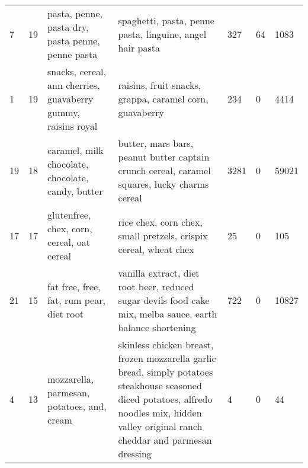 \begin{tabular}{lllllll}
7 & 19 & pasta, penne, pasta dry, pasta penne, penne pasta & spaghetti, pasta, penne pasta, linguine, angel hair pasta & 327 & 64 & 1083 \\
1 & 19 & snacks, cereal, ann cherries, guavaberry gummy, raisins royal & raisins, fruit snacks, grappa, caramel corn, guavaberry & 234 & 0 & 4414 \\
19 & 18 & caramel, milk chocolate, chocolate, candy, butter & butter, mars bars, peanut butter captain crunch cereal, caramel squares, lucky charms cereal & 3281 & 0 & 59021 \\
17 & 17 & glutenfree, chex, corn, cereal, oat cereal & rice chex, corn chex, small pretzels, crispix cereal, wheat chex & 25 & 0 & 105 \\
21 & 15 & fat free, free, fat, rum pear, diet root & vanilla extract, diet root beer, reduced sugar devils food cake mix, melba sauce, earth balance shortening & 722 & 0 & 10827 \\
4 & 13 & mozzarella, parmesan, potatoes, and, cream & skinless chicken breast, frozen mozzarella garlic bread, simply potatoes steakhouse seasoned diced potatoes, alfredo noodles mix, hidden valley original ranch cheddar and parmesan dressing & 4 & 0 & 44 \\
\bottomrule
\end{tabular}
